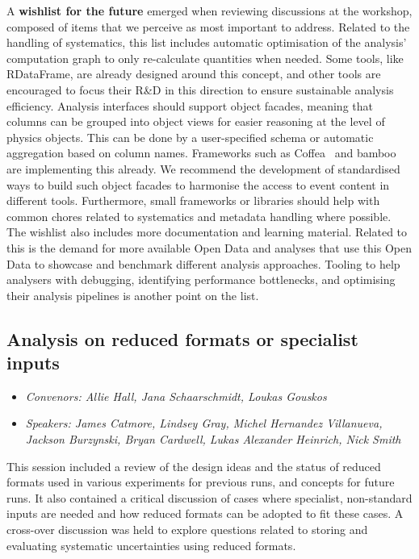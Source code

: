 \documentclass[a4paper,11pt]{article}
\begin{document}
A \textbf{wishlist for the future} emerged when reviewing discussions at
the workshop, composed of items that we perceive as most important to
address. Related to the handling of systematics, this list includes
automatic optimisation of the analysis' computation graph to only
re-calculate quantities when needed. Some tools, like RDataFrame, are
already designed around this concept, and other tools are encouraged to
focus their R\&D in this direction to ensure sustainable analysis
efficiency. Analysis interfaces should support object facades, meaning
that columns can be grouped into object views for easier reasoning at
the level of physics objects. This can be done by a user-specified
schema or automatic aggregation based on column names. Frameworks such
as Coffea~\cite{lindsey_gray_2022_7158492} and bamboo~\cite{David:2021ohq} are
implementing this already. We recommend the development of standardised
ways to build such object facades to harmonise the access to event
content in different tools. Furthermore, small frameworks or libraries
should help with common chores related to systematics and metadata
handling where possible. The wishlist also includes more documentation
and learning material. Related to this is the demand for more available
Open Data and analyses that use this Open Data to showcase and benchmark
different analysis approaches. Tooling to help analysers with debugging,
identifying performance bottlenecks, and optimising their analysis
pipelines is another point on the list.

\hypertarget{analysis-on-reduced-formats-or-specialist-inputs}{%
\subsection{Analysis on reduced formats or specialist
inputs}\label{analysis-on-reduced-formats-or-specialist-inputs}}

\begin{itemize}
    \item \emph{Convenors: Allie Hall, Jana Schaarschmidt, Loukas Gouskos}
    \item \emph{Speakers: James Catmore, Lindsey Gray, Michel Hernandez Villanueva, Jackson Burzynski, Bryan Cardwell, Lukas Alexander Heinrich, Nick Smith}
\end{itemize}

This session included a review of the design ideas and the status of
reduced formats used in various experiments for previous runs, and
concepts for future runs. It also contained a critical discussion of
cases where specialist, non-standard inputs are needed and how reduced
formats can be adopted to fit these cases. A cross-over discussion was
held to explore questions related to storing and evaluating systematic
uncertainties using reduced formats.
\end{document}
